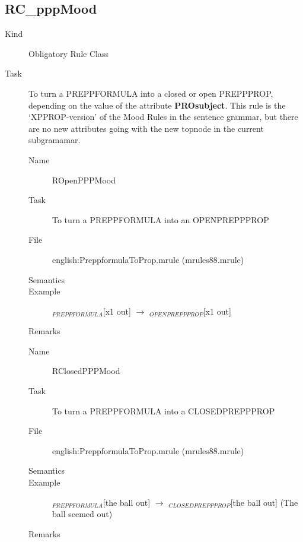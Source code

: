 \subsection{RC\_pppMood}
\begin{description}
\item[Kind] Obligatory Rule Class
\item[Task] To turn a PREPPFORMULA into a closed or open PREPPPROP, depending 
on the value of the attribute {\bf PROsubject}. This rule is the 
`XPPROP-version' of the Mood Rules in the sentence grammar, but there are no 
new attributes going with the new topnode in the current subgramamar.

\vspace{1 cm}
\begin{description}
\item[Name] ROpenPPPMood
\item[Task] To turn a PREPPFORMULA into an OPENPREPPPROP
\item[File] english:PreppformulaToProp.mrule (mrules88.mrule)
\item[Semantics] 
\item[Example] $_{PREPPFORMULA}$[x1 out] $\rightarrow$ $_{OPENPREPPPROP}$[x1 
out]
\item[Remarks]
\end{description}

\vspace{1 cm}
\begin{description}
\item[Name] RClosedPPPMood
\item[Task] To turn a PREPPFORMULA into a CLOSEDPREPPPROP
\item[File] english:PreppformulaToProp.mrule (mrules88.mrule)
\item[Semantics] 
\item[Example] $_{PREPPFORMULA}$[the ball out] $\rightarrow$ 
$_{CLOSEDPREPPPROP}$[the ball out] (The ball seemed out)
\item[Remarks] 
\end{description}

\end{description}

\newpage
